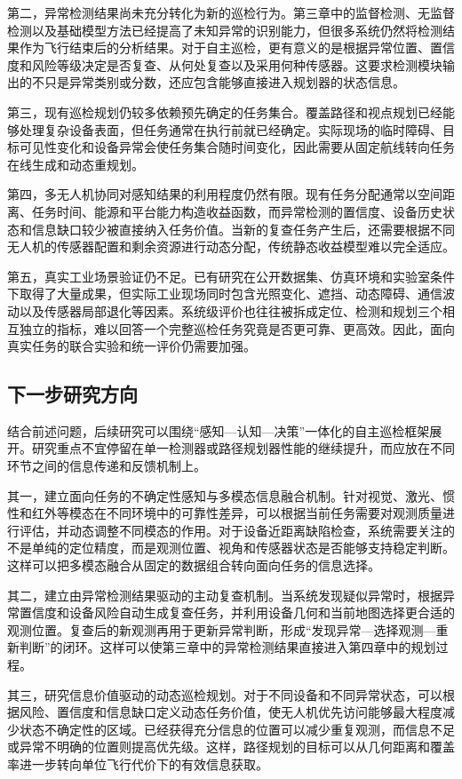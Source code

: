 第二，异常检测结果尚未充分转化为新的巡检行为。第三章中的监督检测、无监督检测以及基础模型方法已经提高了未知异常的识别能力，但很多系统仍然将检测结果作为飞行结束后的分析结果。对于自主巡检，更有意义的是根据异常位置、置信度和风险等级决定是否复查、从何处复查以及采用何种传感器。这要求检测模块输出的不只是异常类别或分数，还应包含能够直接进入规划器的状态信息。

第三，现有巡检规划仍较多依赖预先确定的任务集合。覆盖路径和视点规划已经能够处理复杂设备表面，但任务通常在执行前就已经确定。实际现场的临时障碍、目标可见性变化和设备异常会使任务集合随时间变化，因此需要从固定航线转向任务在线生成和动态重规划。

第四，多无人机协同对感知结果的利用程度仍然有限。现有任务分配通常以空间距离、任务时间、能源和平台能力构造收益函数，而异常检测的置信度、设备历史状态和信息缺口较少被直接纳入任务价值。当新的复查任务产生后，还需要根据不同无人机的传感器配置和剩余资源进行动态分配，传统静态收益模型难以完全适应。

第五，真实工业场景验证仍不足。已有研究在公开数据集、仿真环境和实验室条件下取得了大量成果，但实际工业现场同时包含光照变化、遮挡、动态障碍、通信波动以及传感器局部退化等因素。系统级评价也往往被拆成定位、检测和规划三个相互独立的指标，难以回答一个完整巡检任务究竟是否更可靠、更高效。因此，面向真实任务的联合实验和统一评价仍需要加强。

\subsection{下一步研究方向}

结合前述问题，后续研究可以围绕“感知—认知—决策”一体化的自主巡检框架展开。研究重点不宜停留在单一检测器或路径规划器性能的继续提升，而应放在不同环节之间的信息传递和反馈机制上。

其一，建立面向任务的不确定性感知与多模态信息融合机制。针对视觉、激光、惯性和红外等模态在不同环境中的可靠性差异，可以根据当前任务需要对观测质量进行评估，并动态调整不同模态的作用。对于设备近距离缺陷检查，系统需要关注的不是单纯的定位精度，而是观测位置、视角和传感器状态是否能够支持稳定判断。这样可以把多模态融合从固定的数据组合转向面向任务的信息选择。

其二，建立由异常检测结果驱动的主动复查机制。当系统发现疑似异常时，根据异常置信度和设备风险自动生成复查任务，并利用设备几何和当前地图选择更合适的观测位置。复查后的新观测再用于更新异常判断，形成“发现异常—选择观测—重新判断”的闭环。这样可以使第三章中的异常检测结果直接进入第四章中的规划过程。

其三，研究信息价值驱动的动态巡检规划。对于不同设备和不同异常状态，可以根据风险、置信度和信息缺口定义动态任务价值，使无人机优先访问能够最大程度减少状态不确定性的区域。已经获得充分信息的位置可以减少重复观测，而信息不足或异常不明确的位置则提高优先级。这样，路径规划的目标可以从几何距离和覆盖率进一步转向单位飞行代价下的有效信息获取。

